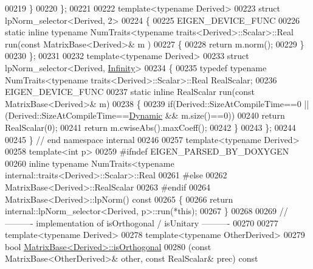 \begin{DoxyCode}
00219   \}
00220 \};
00221 
00222 \textcolor{keyword}{template}<\textcolor{keyword}{typename} Derived>
00223 \textcolor{keyword}{struct }lpNorm\_selector<Derived, 2>
00224 \{
00225   EIGEN\_DEVICE\_FUNC
00226   \textcolor{keyword}{static} \textcolor{keyword}{inline} \textcolor{keyword}{typename} NumTraits<typename traits<Derived>::Scalar>::Real run(\textcolor{keyword}{const} MatrixBase<Derived>& m
      )
00227   \{
00228     \textcolor{keywordflow}{return} m.norm();
00229   \}
00230 \};
00231 
00232 \textcolor{keyword}{template}<\textcolor{keyword}{typename} Derived>
00233 \textcolor{keyword}{struct }lpNorm\_selector<Derived, \hyperlink{namespace_eigen_a7951593b031e13d90223c83d022ce99e}{Infinity}>
00234 \{
00235   \textcolor{keyword}{typedef} \textcolor{keyword}{typename} NumTraits<typename traits<Derived>::Scalar>::Real RealScalar;
00236   EIGEN\_DEVICE\_FUNC
00237   \textcolor{keyword}{static} \textcolor{keyword}{inline} RealScalar run(\textcolor{keyword}{const} MatrixBase<Derived>& m)
00238   \{
00239     \textcolor{keywordflow}{if}(Derived::SizeAtCompileTime==0 || (Derived::SizeAtCompileTime==\hyperlink{namespace_eigen_ad81fa7195215a0ce30017dfac309f0b2}{Dynamic} && m.size()==0))
00240       \textcolor{keywordflow}{return} RealScalar(0);
00241     \textcolor{keywordflow}{return} m.cwiseAbs().maxCoeff();
00242   \}
00243 \};
00244 
00245 \} \textcolor{comment}{// end namespace internal}
00246 
00257 \textcolor{keyword}{template}<\textcolor{keyword}{typename} Derived>
00258 \textcolor{keyword}{template}<\textcolor{keywordtype}{int} p>
00259 \textcolor{preprocessor}{#ifndef EIGEN\_PARSED\_BY\_DOXYGEN}
00260 \textcolor{keyword}{inline} \textcolor{keyword}{typename} NumTraits<typename internal::traits<Derived>::Scalar>::Real
00261 \textcolor{preprocessor}{#else}
00262 MatrixBase<Derived>::RealScalar
00263 \textcolor{preprocessor}{#endif}
00264 MatrixBase<Derived>::lpNorm()\textcolor{keyword}{ const}
00265 \textcolor{keyword}{}\{
00266   \textcolor{keywordflow}{return} internal::lpNorm\_selector<Derived, p>::run(*\textcolor{keyword}{this});
00267 \}
00268 
00269 \textcolor{comment}{//---------- implementation of isOrthogonal / isUnitary ----------}
00270 
00277 \textcolor{keyword}{template}<\textcolor{keyword}{typename} Derived>
00278 \textcolor{keyword}{template}<\textcolor{keyword}{typename} OtherDerived>
00279 \textcolor{keywordtype}{bool} \hyperlink{group___core___module_aefdc8e4e4c156fdd79a21479e75dcd8a}{MatrixBase<Derived>::isOrthogonal}
00280 (\textcolor{keyword}{const} MatrixBase<OtherDerived>& other, \textcolor{keyword}{const} RealScalar& prec)\textcolor{keyword}{ const}

\end{DoxyCode}
